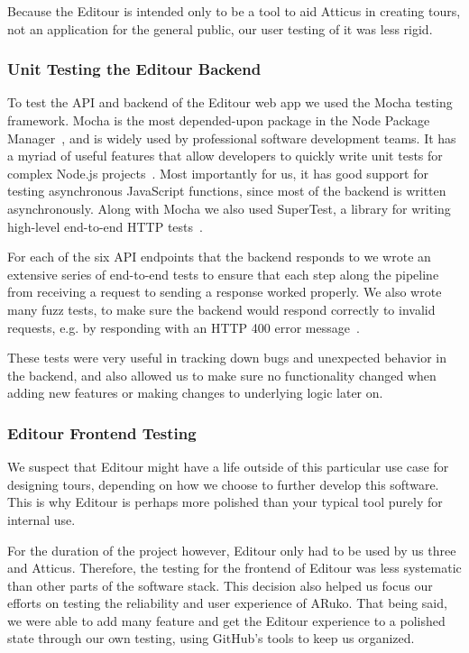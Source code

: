 \documentclass[a4paper, 10pt, american, titlepage]{article}
\begin{document}
Because the Editour is intended only to be a tool to aid Atticus in creating
tours, not an application for the general public, our user testing of it was less
rigid.

\subsubsection{Unit Testing the Editour Backend}
\label{sec:unitTestingTheEditourBackend}

To test the API and backend of the Editour web app we used the Mocha testing
framework. Mocha is the most depended-upon package in the Node Package
Manager~\autocite{tidelift2019}, and is widely used by professional software
development teams. It has a myriad of useful features that allow developers to
quickly write unit tests for complex Node.js projects~\autocite{mochajs2019}.
Most importantly for us, it has good support for testing asynchronous JavaScript
functions, since most of the backend is written asynchronously. Along with Mocha
we also used SuperTest, a library for writing high-level end-to-end HTTP
tests~\autocite{supertest2019}.

For each of the six API endpoints that the backend responds to we wrote an
extensive series of end-to-end tests to ensure that each step along the pipeline
from receiving a request to sending a response worked properly. We also wrote
many fuzz tests, to make sure the backend would respond correctly to invalid
requests, e.g. by responding with an HTTP 400 error message~\autocite{rfc7231}.

These tests were very useful in tracking down bugs and unexpected behavior in
the backend, and also allowed us to make sure no functionality changed when
adding new features or making changes to underlying logic later on.

\subsubsection{Editour Frontend Testing}
\label{sec:editourFrontendTesting}

We suspect that Editour might have a life outside of this particular use case
for designing tours, depending on how we choose to further develop this
software. This is why Editour is perhaps more polished than your typical tool
purely for internal use.

For the duration of the project however, Editour only had to be used by us
three and Atticus. Therefore, the testing for the frontend of Editour was less
systematic than other parts of the software stack. This decision also helped us
focus our efforts on testing the reliability and user experience of ARuko. That
being said, we were able to add many feature and get the Editour experience to
a polished state through our own testing, using GitHub's tools to keep us
organized.
\end{document}
